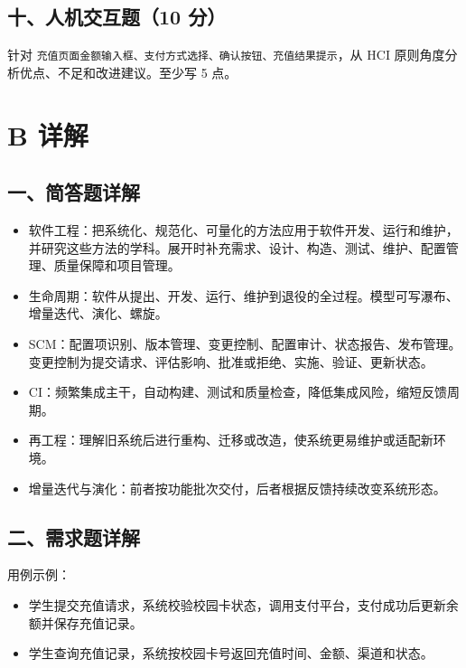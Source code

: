 \documentclass[UTF8,zihao=-4]{ctexart}
\begin{document}
\subsection{十、人机交互题（10 分）}


针对 \texttt{充值页面金额输入框、支付方式选择、确认按钮、充值结果提示}，从 HCI 原则角度分析优点、不足和改进建议。至少写 5 点。


\section{B 详解}


\subsection{一、简答题详解}


\begin{itemize}
\item 软件工程：把系统化、规范化、可量化的方法应用于软件开发、运行和维护，并研究这些方法的学科。展开时补充需求、设计、构造、测试、维护、配置管理、质量保障和项目管理。
\item 生命周期：软件从提出、开发、运行、维护到退役的全过程。模型可写瀑布、增量迭代、演化、螺旋。
\item SCM：配置项识别、版本管理、变更控制、配置审计、状态报告、发布管理。变更控制为提交请求、评估影响、批准或拒绝、实施、验证、更新状态。
\item CI：频繁集成主干，自动构建、测试和质量检查，降低集成风险，缩短反馈周期。
\item 再工程：理解旧系统后进行重构、迁移或改造，使系统更易维护或适配新环境。
\item 增量迭代与演化：前者按功能批次交付，后者根据反馈持续改变系统形态。
\end{itemize}



\subsection{二、需求题详解}


用例示例：


\begin{itemize}
\item 学生提交充值请求，系统校验校园卡状态，调用支付平台，支付成功后更新余额并保存充值记录。
\item 学生查询充值记录，系统按校园卡号返回充值时间、金额、渠道和状态。
\end{itemize}
\end{document}
